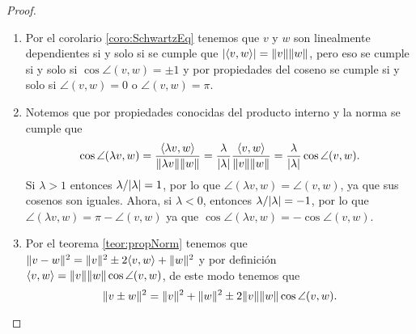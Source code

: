 \begin{proof}~
  \begin{enumerate}
    \item Por el corolario \ref{coro:SchwartzEq} tenemos que $v$ y $w$ son linealmente dependientes si y solo si se cumple que $\mathopen|\langle v,w\rangle\mathclose| = \mathopen\|v\mathclose\|\mathopen\|w\mathclose\|$, pero eso se cumple si y solo si $\cos\angle(v,w) = \pm 1$ y por propiedades del coseno se cumple si y solo si $\angle(v,w) = 0$  o $\angle(v,w) = \pi$.
    
    \item Notemos que por propiedades conocidas del producto interno y la norma se cumple que 
      \[
        \cos\angle(\lambda v,w) = \frac{\langle\lambda v,w\rangle}{\mathopen\|\lambda v\mathclose\| \mathopen\|w\mathclose\|}
          = \frac{\lambda}{\mathopen|\lambda\mathclose|}  \frac{\langle v,w\rangle}{\mathopen\|v\mathclose\| \mathopen\|w\mathclose\|}
          = \frac{\lambda}{\mathopen|\lambda\mathclose|} \cos\angle(v,w).
      \]
      Si $\lambda > 1$ entonces $\lambda/\mathopen|\lambda\mathclose| = 1$, por lo que $\angle(\lambda v ,w) = \angle(v,w)$, ya que sus cosenos son iguales. Ahora, si $\lambda<0$, entonces $\lambda/\mathopen|\lambda\mathclose| = -1$, por lo que $\angle(\lambda v,w) = \pi - \angle(v,w)$ ya que $\cos\angle(\lambda v,w) = -\cos\angle(v,w)$.

      \item Por el teorema \ref{teor:propNorm} tenemos que $\mathopen\|v - w\mathclose\|^2 = \mathopen\|v\mathclose\|^2 \pm 2 \langle v,w\rangle + \mathopen\|w\mathclose\|^2$ y por definición $\langle v,w\rangle = \mathopen\|v\mathclose\|\mathopen\|w\mathclose\| \cos\angle(v,w)$, de este modo tenemos que 
        \[ \mathopen\|v \pm w\mathclose\|^2 = \mathopen\|v\mathclose\|^2  + \mathopen\|w\mathclose\|^2 \pm 2 \mathopen\|v\mathclose\|\mathopen\|w\mathclose\| \cos\angle(v,w). \qedhere \]
  \end{enumerate}
\end{proof}